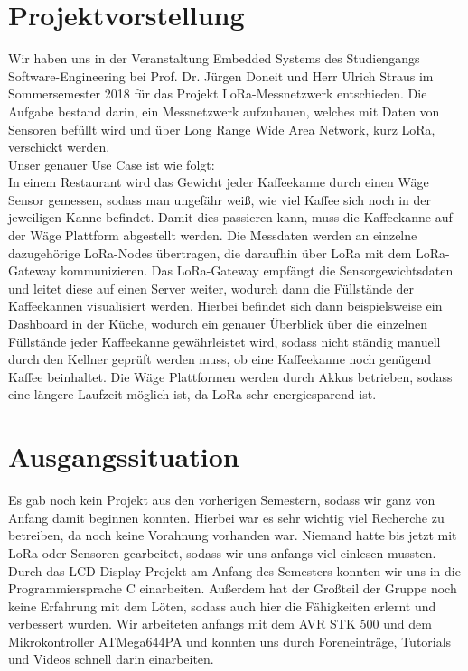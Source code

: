 




\chapter{Projektvorstellung}
Wir haben uns in der Veranstaltung Embedded Systems des Studiengangs Software-Engineering bei Prof. Dr. Jürgen Doneit und Herr Ulrich Straus im Sommersemester 2018 für das Projekt LoRa-Messnetzwerk entschieden. Die Aufgabe bestand darin, ein Messnetzwerk aufzubauen, welches mit Daten von Sensoren befüllt wird und über Long Range Wide Area Network, kurz LoRa, verschickt werden.\\
Unser genauer Use Case ist wie folgt:\\
In einem Restaurant wird das Gewicht jeder Kaffeekanne durch einen Wäge Sensor gemessen, sodass man ungefähr weiß, wie viel Kaffee sich noch in der jeweiligen Kanne befindet. Damit dies passieren kann, muss die Kaffeekanne auf der Wäge Plattform abgestellt werden. Die Messdaten werden an einzelne dazugehörige LoRa-Nodes übertragen, die daraufhin über LoRa mit dem LoRa-Gateway kommunizieren. Das LoRa-Gateway empfängt die Sensorgewichtsdaten und leitet diese auf einen Server weiter, wodurch dann die Füllstände der Kaffeekannen visualisiert werden. Hierbei befindet sich dann beispielsweise ein Dashboard in der Küche, wodurch ein genauer Überblick über die einzelnen Füllstände jeder Kaffeekanne gewährleistet wird, sodass nicht ständig manuell durch den Kellner geprüft werden muss, ob eine Kaffeekanne noch genügend Kaffee beinhaltet. Die Wäge Plattformen werden durch Akkus betrieben, sodass eine längere Laufzeit möglich ist, da LoRa sehr energiesparend ist.

\chapter{Ausgangssituation}
Es gab noch kein Projekt aus den vorherigen Semestern, sodass wir ganz von Anfang damit beginnen konnten. Hierbei war es sehr wichtig viel Recherche zu betreiben, da noch keine Vorahnung vorhanden war. Niemand hatte bis jetzt mit LoRa oder Sensoren gearbeitet, sodass wir uns anfangs viel einlesen mussten. Durch das LCD-Display Projekt am Anfang des Semesters konnten wir uns in die Programmiersprache C einarbeiten. Außerdem hat der Großteil der Gruppe noch keine Erfahrung mit dem Löten, sodass auch hier die Fähigkeiten erlernt und verbessert wurden. Wir arbeiteten anfangs mit dem AVR STK 500 und dem Mikrokontroller ATMega644PA und konnten uns durch Foreneinträge, Tutorials und Videos schnell darin einarbeiten.

